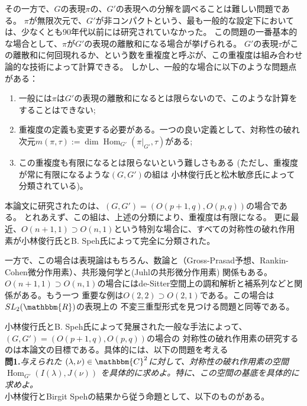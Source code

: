 \documentclass[a4paper]{article} %
\newcommand{\assign}{:=}
\newcommand{\tmop}[1]{\ensuremath{\operatorname{#1}}}
\newcommand{\tmtextbf}[1]{{\bfseries{#1}}}
\newcommand{\tmtextit}[1]{{\itshape{#1}}}
\begin{document}
その一方で、$G$の表現$\pi$の、$G'$の表現への分解を調べることは難しい問題である。
$\pi$が無限次元で、$G'$が非コンパクトという、最も一般的な設定下においては、少なくとも90年代以前には研究されていなかった。
この問題の一番基本的な場合として、$\pi$が$G'$の表現の離散和になる場合が挙げられる。
$G'$の表現$\tau$がこの離散和に何回現れるか、という数を重複度と呼ぶが、この重複度は組み合わせ論的な技術によって計算できる。
しかし、一般的な場合に以下のような問題点がある：
\begin{enumerate}
\item 一般には$\pi$は$G'$の表現の離散和になるとは限らないので、このような計算をすることはできない;
\item 重複度の定義も変更する必要がある。一つの良い定義として、対称性の破れ次元$m(\pi,\tau)\assign\dim\tmop{Hom}_{G'}(\pi |_{G'},
 \tau)$がある;
\item この重複度も有限になるとは限らないという難しさもある (ただし、重複度が常に有限になるような$(G,G')$の組は
小林俊行氏と松木敏彦氏によって分類されている)。
\end{enumerate}

本論文に研究されたのは、$( G, G') = ( O ( p + 1, q), O ( p,q))$の場合である。
とれあえず、この組は、上述の分類により、重複度は有限になる。
更に最近、$O ( n + 1, 1) \supset O ( n, 1)$という特別な場合に、すべての対称性の破れ作用素が小林俊行氏とB. Speh氏によって完全に分類された。

一方で、この場合は表現論はもちろん、数論と（Gross-Prasad予想、Rankin-Cohen微分作用素）、共形幾何学と(Juhlの共形微分作用素)
関係もある。$O ( n + 1, 1) \supset O ( n, 1)$の場合にはde-Sitter空間上の調和解析と補系列などと関係がある。もう一つ
重要な例は$O ( 2, 2) \supset O ( 2, 1)$である。この場合は$SL_2(\mathbbm{R})$の表現上の
不変三重型形式を見つける問題と同等である。

小林俊行氏とB. Speh氏によって発展された一般な手法によって、$( G, G') = ( O ( p + 1, q), O ( p,q))$の場合の
対称性の破れ作用素の研究するのは本論文の目標である。具体的には、以下の問題を考える\\

{\noindent}\tmtextbf{問\textbf{1}.}\tmtextit{与えられた $( \lambda, \nu) \in
\mathbbm{C}^2$に対して、対称性の破れ作用素の空間 $\tmop{Hom}_{G'} ( I (
\lambda), J ( \nu))$ を具体的に求めよ。特に、この空間の基底を具体的に求めよ。}\\

{\noindent}小林俊行とBirgit Spehの結果から従う命題として、以下のものがある。
\end{document}
